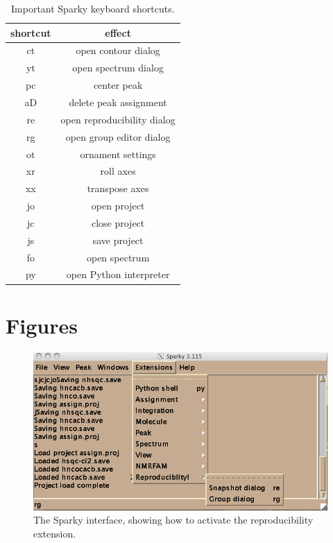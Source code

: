 \begin{table}[h]
  \begin{tabular}{ | c | c | }
    \hline
    shortcut    &   effect                  \\  \hline
    ct      &  open contour dialog          \\  \hline
    yt      &  open spectrum dialog         \\  \hline
    pc      &  center peak                  \\  \hline
    aD      &  delete peak assignment       \\  \hline
    re      &  open reproducibility dialog  \\  \hline
    rg      &  open group editor dialog     \\  \hline
    ot      &  ornament settings            \\  \hline
    xr      &  roll axes                    \\  \hline
    xx      &  transpose axes               \\  \hline
    jo      &  open project                 \\  \hline
    jc      &  close project                \\  \hline
    js      &  save project                 \\  \hline
    fo      &  open spectrum                \\  \hline
    py      &  open Python interpreter      \\  \hline
  \end{tabular}
  \caption{Important Sparky keyboard shortcuts.}
  \label{sparky_shortcuts}
\end{table}



\clearpage
\section{Figures}

\begin{figure}[h]
  \includegraphics[scale=0.6]{figures/sparky_extensions}
  \caption{The Sparky interface, showing how to activate the reproducibility
           extension.}
  \label{sparky_extensions}
\end{figure}

